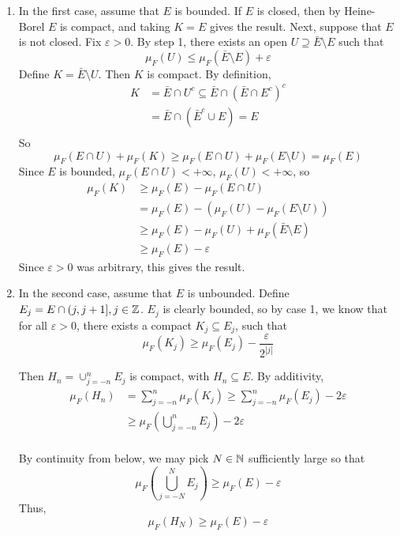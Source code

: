 \documentclass[x11names,reqno,14pt]{extarticle}
\newcommand*{\oo}{\infty}
\begin{document}
\begin{enumerate}
\item In the first case, assume that $E$ is bounded. If $E$ is closed, then by Heine-Borel $E$ is compact, and taking $K = E$ gives the result. Next, suppose that $E$ is not closed. Fix $\varepsilon>0$. By step 1, there exists an open $U\supseteq \bar{E}\setminus E$ such that 
\[
\mu_F(U) \leq \mu_F(\bar{E}\setminus E) + \varepsilon
\]
Define $K = \bar{E}\setminus U$. Then $K$ is compact. By definition, 
\begin{align*}
K & = \bar{E} \cap U^c \subseteq \bar{E} \cap (\bar{E}\cap E^c)^c \\
  & = \bar{E} \cap (\bar{E}^c \cup E) = E \\
\end{align*}
So 
\[
\mu_F(E \cap U) + \mu_F(K) \geq \mu_F(E \cap U) + \mu_F(E\setminus U) = \mu_F(E)
\]
Since $E$ is bounded, $\mu_F(E \cap U) < +\oo$, $\mu_F(U)<+\oo$, so
\begin{align*}
\mu_F(K) & \geq\mu_F(E) - \mu_F(E \cap U) \\
			& = \mu_F(E) - (\mu_F(U) - \mu_F(E\setminus U)) \\
			& \geq \mu_F(E) - \mu_F(U) + \mu_F(\bar{E}\setminus E) \\
			& \geq \mu_F(E) - \varepsilon
\end{align*}
Since $\varepsilon > 0$ was arbitrary, this gives the result. 

\item In the second case, assume that $E$ is unbounded. Define $E_j = E \cap (j, j + 1], j \in \mathbb{Z}$. $E_j$ is clearly bounded, so by case 1, we know that for all $\varepsilon>0$, there exists a compact $K_j\subseteq E_j$, such that
\[
\mu_F(K_j) \geq \mu_F(E_j) - \frac{\varepsilon}{2^{|j|}}
\]

Then $H_n = \cup_{j=-n}^nE_j$ is compact, with $H_n \subseteq E$. By additivity, 
\begin{align*}
\mu_F(H_n) & = \sum_{j=-n}^n\mu_F(K_j)\geq\sum_{j=-n}^n\mu_F(E_j) - 2\varepsilon \\
			  & \geq \mu_F\left(\bigcup_{j=-n}^nE_j\right) - 2\varepsilon \\
\end{align*}

By continuity from below, we may pick $N \in \mathbb{N}$ sufficiently large so that
\[
\mu_F\left(\bigcup_{j=-N}^NE_j\right) \geq \mu_F(E) - \varepsilon
\]
Thus, 
\[
\mu_F(H_N)\geq \mu_F(E) - \varepsilon
\]
\end{enumerate}
\end{document}
